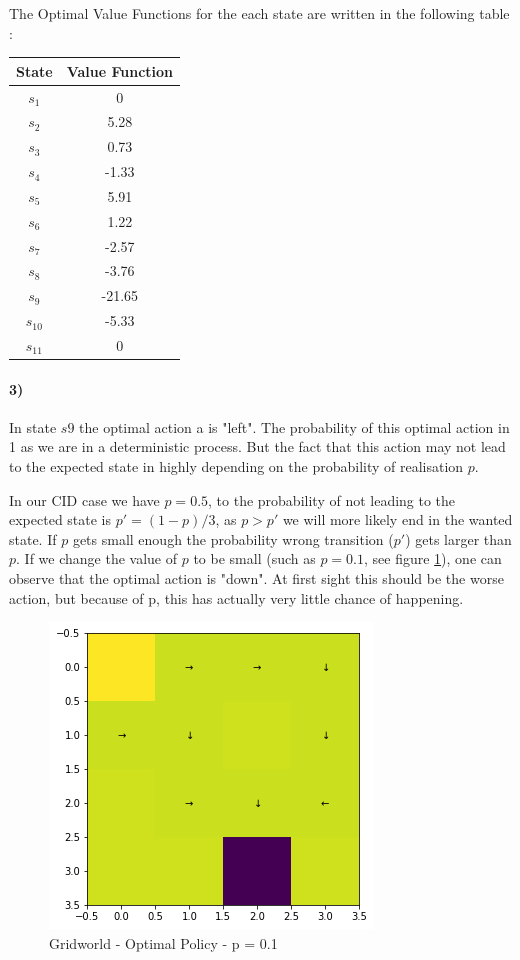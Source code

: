 \documentclass[11pt,a4paper]{article}
\numberwithin{equation}{section}
\begin{document}
The Optimal Value Functions for the each state are written in the following table : 
\begin{table}[H]
\centering
	\begin{tabular}{|c|c|}
		  \hline
State & Value Function \\
	  \hline
  	$s_1$ & 0 \\
	$s_2$ & 5.28 \\ 
	$s_3$ & 0.73 \\
	$s_4$ & -1.33 \\
	$s_5$& 5.91 \\
	$s_6$& 1.22 \\
	$s_7$& -2.57 \\
	$s_8$& -3.76 \\
	$s_9$& -21.65 \\
	$s_{10}$& -5.33 \\
	$s_{11}$& 0 \\
		  \hline

\end{tabular}
\end{table}


\paragraph{3)}
In state $s9$ the optimal action a is "left". The probability of this optimal action in 1 as we are in a deterministic process. But the fact that this action may not lead to the expected state in highly depending on the probability of realisation $p$. 

In our CID case we have $p=0.5$, to the probability of not leading to the expected state is $p' = (1-p) / 3$, as $p > p'$ we will more likely end in the wanted state. If $p$ gets small enough the probability wrong transition ($p'$) gets larger than $p$. If we change the value of $p$ to be small (such as $p=0.1$, see figure \ref{optGrid01}), one can observe that the optimal action is "down". At first sight this should be the worse action, but because of p, this has actually very little chance of happening.


\begin{figure}[H]
	\centering
	\includegraphics[width = 0.5\linewidth]{grid_p01}
	\caption{Gridworld - Optimal Policy - p = 0.1}
	\label{optGrid01}
\end{figure}
\end{document}
